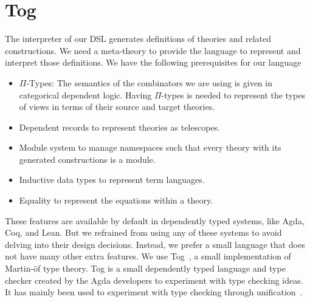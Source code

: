 \chapter{Tog}
\label{ch:tog}

The interpreter of our DSL generates definitions of theories and related constructions. We need a meta-theory to provide the language to represent and interpret those definitions. We have the following prerequisites for our language 
\begin{itemize}
\item $\Pi$-Types: The semantics of the combinators we are using is given in categorical dependent logic. Having $\Pi$-types is needed to represent the types of views in terms of their source and target theories. 
\item Dependent records to represent theories as telescopes. 
\item Module system to manage namespaces such that every theory with its generated constructions is a module. 
\item Inductive data types to represent term languages. 
\item Equality to represent the equations within a theory. 
\end{itemize}

These features are available by default in dependently typed systems, like Agda, Coq, and Lean. But we refrained from using any of these systems to avoid delving into their design decisions. Instead, we prefer a small language that does not have many other extra features. We use Tog~\cite{tog}, a small implementation of Martin-\"{o}f type theory. 
Tog is a small dependently typed language and type checker created by the Agda developers to experiment with type checking ideas. It has mainly been used to experiment with type checking through unification~\cite{mazzoli2016type}. 

